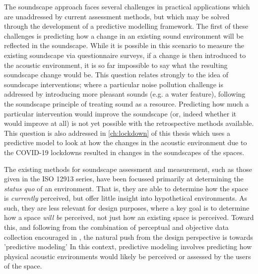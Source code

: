 

The soundscape approach faces several challenges in practical applications which are unaddressed by current assessment methods, but which may be solved through the development of a predictive modelling framework. The first of these challenges is predicting how a change in an existing sound environment will be reflected in the soundscape. While it is possible in this scenario to measure the existing soundscape via questionnaire surveys, if a change is then introduced to the acoustic environment, it is so far impossible to say what the resulting soundscape change would be. This question relates strongly to the idea of soundscape interventions; where a particular noise pollution challenge is addressed by introducing more pleasant sounds (e.g. a water feature), following the soundscape principle of treating sound as a resource. Predicting how much a particular intervention would improve the soundscape (or, indeed whether it would improve at all) is not yet possible with the retrospective methods available. This question is also addressed in \cref{ch:lockdown} of this thesis \citep{Mitchell2021Investigating} which uses a predictive model to look at how the changes in the acoustic environment due to the COVID-19 lockdowns resulted in changes in the soundscapes of the spaces.

The existing methods for soundscape assessment and measurement, such as those given in the ISO 12913 series, have been focussed primarily at determining the \emph{status quo} of an environment. That is, they are able to determine how the space is \emph{currently} perceived, but offer little insight into hypothetical environments. As such, they are less relevant for design purposes, where a key goal is to determine how a space \emph{will be} perceived, not just how an existing space is perceived. Toward this, and following from the combination of perceptual and objective data collection encouraged in \citet{ISO12913Part2}, the natural push from the design perspective is towards 'predictive modeling' In this context, predictive modeling involves predicting how physical acoustic environments would likely be perceived or assessed by the users of the space.

